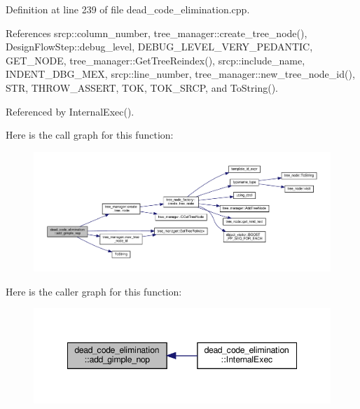 Definition at line 239 of file dead\+\_\+code\+\_\+elimination.\+cpp.



References srcp\+::column\+\_\+number, tree\+\_\+manager\+::create\+\_\+tree\+\_\+node(), Design\+Flow\+Step\+::debug\+\_\+level, D\+E\+B\+U\+G\+\_\+\+L\+E\+V\+E\+L\+\_\+\+V\+E\+R\+Y\+\_\+\+P\+E\+D\+A\+N\+T\+IC, G\+E\+T\+\_\+\+N\+O\+DE, tree\+\_\+manager\+::\+Get\+Tree\+Reindex(), srcp\+::include\+\_\+name, I\+N\+D\+E\+N\+T\+\_\+\+D\+B\+G\+\_\+\+M\+EX, srcp\+::line\+\_\+number, tree\+\_\+manager\+::new\+\_\+tree\+\_\+node\+\_\+id(), S\+TR, T\+H\+R\+O\+W\+\_\+\+A\+S\+S\+E\+RT, T\+OK, T\+O\+K\+\_\+\+S\+R\+CP, and To\+String().



Referenced by Internal\+Exec().

Here is the call graph for this function\+:
\nopagebreak
\begin{figure}[H]
\begin{center}
\leavevmode
\includegraphics[width=350pt]{d5/d8b/classdead__code__elimination_aa17a85671486094c9539adb9dc3a9739_cgraph}
\end{center}
\end{figure}
Here is the caller graph for this function\+:
\nopagebreak
\begin{figure}[H]
\begin{center}
\leavevmode
\includegraphics[width=348pt]{d5/d8b/classdead__code__elimination_aa17a85671486094c9539adb9dc3a9739_icgraph}
\end{center}
\end{figure}
\mbox{\label{classdead__code__elimination_a76cbac14d90ba6ac5229416d7d90667f}} 
